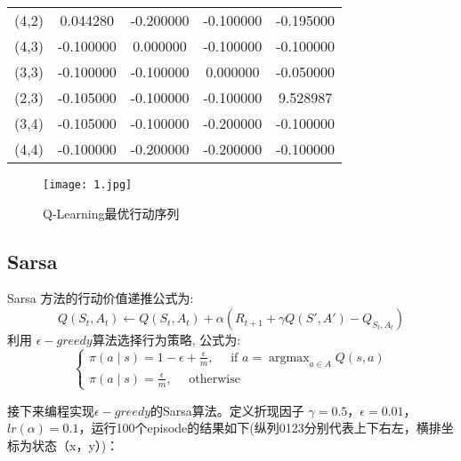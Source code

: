 \documentclass[lang=cn,a4paper]{elegantpaper}
\begin{document}
\begin{table}[htbp]
\begin{tabular}{ccccc}
     (4,2)&  0.044280& -0.200000& -0.100000& -0.195000 \\
     (4,3)& -0.100000&  0.000000& -0.100000& -0.100000 \\
     (3,3)& -0.100000& -0.100000&  0.000000& -0.050000 \\
     (2,3)& -0.105000& -0.100000& -0.100000&  9.528987 \\
     (3,4)& -0.105000& -0.100000& -0.200000& -0.100000 \\
     (4,4)& -0.100000& -0.200000& -0.200000& -0.100000 \\
    \hline
    \end{tabular}%
  \label{tab:addlabel}%
\end{table}%

\begin{figure}[H]
  \centering
  \texttt{[image: 1.jpg]}
  \caption{Q-Learning最优行动序列} 
  \label{Fig.1}
\end{figure}




\subsection{Sarsa}

Sarsa 方法的行动价值递推公式为:
$$
Q\left(S_{t}, A_{t}\right) \leftarrow Q\left(S_{t}, A_{t}\right)+\alpha\left(R_{t+1}+\gamma Q\left(S', A'\right)-Q_{S_{t}, A_{t}}\right)
$$
利用  $\epsilon -greedy$算法选择行为策略,  公式为:
$$
\left\{\begin{array}{l}
\pi(a \mid s)=1-\epsilon+\frac{\epsilon}{m}, \quad \text { if } a=\operatorname{argmax}_{a \in A} Q(s, a) \\
\pi(a \mid s)=\frac{\epsilon}{m}, \quad \text { otherwise }
\end{array}\right.
$$

接下来编程实现$\epsilon - greedy$的Sarsa算法。定义折现因子 $\gamma = 0.5$，$\epsilon = 0.01$，$lr(\alpha) = 0.1$，运行100个episode的结果如下(纵列0123分别代表上下右左，横排坐标为状态（x，y）)：
\end{document}
